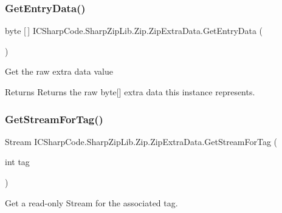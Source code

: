 \subsubsection{\texorpdfstring{Get\+Entry\+Data()}{GetEntryData()}\hspace{0.1cm}{\footnotesize\ttfamily [2/2]}}
{\footnotesize\ttfamily byte \mbox{[}$\,$\mbox{]} I\+C\+Sharp\+Code.\+Sharp\+Zip\+Lib.\+Zip.\+Zip\+Extra\+Data.\+Get\+Entry\+Data (\begin{DoxyParamCaption}{ }\end{DoxyParamCaption})\hspace{0.3cm}{\ttfamily [inline]}}



Get the raw extra data value 

\begin{DoxyReturn}{Returns}
Returns the raw byte\mbox{[}\mbox{]} extra data this instance represents.
\end{DoxyReturn}
\mbox{\label{class_i_c_sharp_code_1_1_sharp_zip_lib_1_1_zip_1_1_zip_extra_data_a511506164310e864f98bea4223737d00}} 
\subsubsection{\texorpdfstring{Get\+Stream\+For\+Tag()}{GetStreamForTag()}\hspace{0.1cm}{\footnotesize\ttfamily [1/2]}}
{\footnotesize\ttfamily Stream I\+C\+Sharp\+Code.\+Sharp\+Zip\+Lib.\+Zip.\+Zip\+Extra\+Data.\+Get\+Stream\+For\+Tag (\begin{DoxyParamCaption}\item[{int}]{tag }\end{DoxyParamCaption})\hspace{0.3cm}{\ttfamily [inline]}}



Get a read-\/only Stream for the associated tag. 


